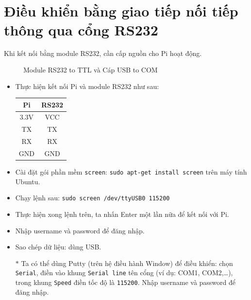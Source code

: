 \section{Điều khiển bằng giao tiếp nối tiếp thông qua cổng RS232} \label{Sec:rs232}
Khi kết nối bằng module RS232, cần cấp nguồn cho Pi hoạt động.
\begin{figure}[!h]
\begin{center}
\hspace{1cm}
\end{center}
\caption{Module RS232 to TTL và Cáp USB to COM}
\end{figure}
\begin{itemize}
\item Thực hiện kết nối Pi và module RS232 như sau:
\begin{center}
\begin{tabular}{c|c}
Pi & RS232\\ \hline
3.3V & VCC\\
TX & TX \\ 
RX & RX\\
GND & GND
\end{tabular}
\end{center}
\item Cài đặt gói phần mềm \verb|screen|: \verb|sudo apt-get install screen| trên máy tính Ubuntu.
\item Chạy lệnh sau: \verb|sudo screen /dev/ttyUSB0 115200|
\item Thực hiện xong lệnh trên, ta nhấn Enter một lần nữa để kết nối với Pi.
\item Nhập username và password để đăng nhập.
\item Sao chép dữ liệu: dùng USB.
\item[$\ast$] Ta có thể dùng Putty (trên hệ điều hành Window) để điều khiển: chọn \verb|Serial|, điền vào khung \verb|Serial line| tên cổng (ví dụ: COM1, COM2,\ldots), trong khung \verb|Speed| điền tốc độ là \verb|115200|. Nhập username và password để đăng nhập.
\end{itemize}
